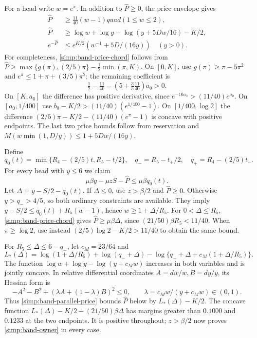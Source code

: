 For a head write $w=e^\pi$. In addition to $\widehat P\ge0$,
the price envelope gives
\begin{align}
 \widehat P&\ge\tfrac{11}{40}(w-1)quad(1\le w\le2),
                                                   \label{simp:band-price-chord}\\
 \widehat P&\ge\log w+\log y-\log(y+5Dw/16)-K/2,
                                                   \label{simp:band-parallel-price}\\
 e^{-\widehat P}&\le e^{K/2}(w^{-1}+5D/(16y))\quad(y>0).
                                                   \label{simp:band-tail-price}
\end{align}
For completeness, \eqref{simp:band-price-chord} follows from
$\widehat P\ge\max\{g(\pi),(2/5)\pi\}-\frac12\min(\pi,K)$.
On $[0,K]$, use $g(\pi)\ge\pi-5\pi^2$ and
$e^\pi\le1+\pi+(3/5)\pi^2$; the remaining coefficient is
\[
 \tfrac12-\tfrac{11}{40}-(5+\tfrac35\tfrac{11}{40})a_0>0.
\]
On $[K,a_0]$ the difference has positive derivative, since
$e^{-10a_0}>(11/40)e^{a_0}$.
On $[a_0,1/400]$ use $b_0-K/2>(11/40)(e^{1/400}-1)$.
On $[1/400,\log2]$ the difference
$(2/5)\pi-K/2-(11/40)(e^\pi-1)$ is concave with positive endpoints.
The last two price bounds follow from reservation and
$M(w\min(1,D/y))\le1+5Dw/(16y)$.

Define
\[
 q_0(t)=\min\{R_4-(2/5)t,R_5-t/2\},\quad
 q_-=R_5-t_+/2,\quad q_+=R_4-(2/5)t_-.
\]
For every head with $y\le6$ we claim
\begin{equation}\label{simp:band-owner}
 \mu\beta y-\mu zS-\widehat P\le\mu\beta q_0(t).
\end{equation}
Let $\Delta=y-S/2-q_0(t)$. If $\Delta\le0$, use
$z>\beta/2$ and $\widehat P\ge0$.
Otherwise $y>q_->4/5$, so both ordinary constraints are available.
They imply
$y-S/2\le q_0(t)+R_5(w-1)$, hence $w\ge1+\Delta/R_5$.
For $0<\Delta\le R_5$, \eqref{simp:band-price-chord} gives
$\widehat P\ge\mu\beta\Delta$, since
$(21/50)\beta R_5<11/40$.
When $\pi\ge\log2$, use instead
$(2/5)\log2-K/2>11/40$ to obtain the same bound.

For $R_5\le\Delta\le6-q_-$, let $c_M=23/64$ and
\[
 L_*(\Delta)=\log(1+\Delta/R_5)+\log(q_-+\Delta)
 -\log\{q_-+\Delta+c_M(1+\Delta/R_5)\}.
\]
The function $\log w+\log y-\log(y+c_Mw)$ increases in both
variables and is jointly concave. In relative differential coordinates
$A=dw/w,B=dy/y$, its Hessian form is
\[
 -A^2-B^2+(\lambda A+(1-\lambda)B)^2\le0,
 \qquad \lambda=c_Mw/(y+c_Mw)\in(0,1).
\]
Thus \eqref{simp:band-parallel-price} bounds $\widehat P$ below by
$L_*(\Delta)-K/2$. The concave function
$L_*(\Delta)-K/2-(21/50)\beta\Delta$ has margins greater than
$0.1000$ and $0.1233$ at the two endpoints.
It is positive throughout; $z>\beta/2$ now proves
\eqref{simp:band-owner} in every case.

